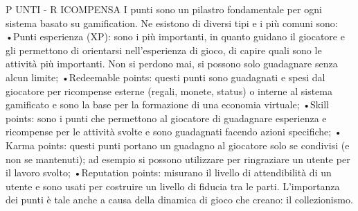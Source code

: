 P UNTI - R ICOMPENSA I punti sono un pilastro fondamentale per ogni sistema
basato su gamification. Ne esistono di diversi tipi e i più comuni sono:
•Punti esperienza (XP): sono i più importanti, in quanto guidano il giocatore e gli permettono di orientarsi nell'esperienza di gioco, di capire quali sono le attività più importanti. Non si perdono mai, si possono solo guadagnare senza alcun limite;
•Redeemable points: questi punti sono guadagnati e spesi dal giocatore per ricompense esterne (regali, monete, status) o interne al sistema gamificato e sono la base per la formazione di una economia virtuale;
•Skill points: sono i punti che permettono al giocatore di guadagnare esperienza e ricompense per le attività svolte e sono guadagnati facendo azioni specifiche;
• Karma points: questi punti portano un guadagno al giocatore solo se condivisi (e non se mantenuti); ad esempio si possono utilizzare per ringraziare un utente per il lavoro svolto;
•Reputation points: misurano il livello di attendibilità di un utente e sono usati per costruire un livello di fiducia tra le parti.
L'importanza dei punti è tale anche a causa della dinamica di gioco che creano: il collezionismo.

